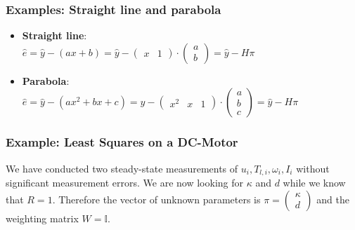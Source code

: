 \documentclass[10pt,a4paper]{scrartcl}
\begin{document}
\begin{multicols*}{3}

\subsubsection{Examples: Straight line and parabola}
\begin{itemize}
\item \textbf{Straight line}:\\
$\hat{e}=\hat{y}-(ax+b)=\hat{y}- \begin{pmatrix} x&1 \end{pmatrix} \cdot \begin{pmatrix} a\\ b\end{pmatrix}=\hat{y}-H\pi$
\item \textbf{Parabola}:\\
$\hat{e}=\hat{y}-(ax^2+bx+c)=\hat{y}- \begin{pmatrix} x^2&x&1 \end{pmatrix} \cdot \begin{pmatrix} a\\ b \\ c\end{pmatrix}=\hat{y}-H\pi$
\end{itemize}

\vfill
\null
\columnbreak

\subsubsection{Example: Least Squares on a DC-Motor}
We have conducted two steady-state measurements of $u_i,T_{l,i},\omega_i,I_i$ without significant measurement errors.
We are now looking for $\kappa$ and $d$ while we know that $R=1$.
Therefore the vector of unknown parameters is $\pi=\begin{pmatrix} \kappa \\d\end{pmatrix}$ and the weighting matrix $W=\mathbb{I}$.\\


\end{multicols*}
\end{document}

